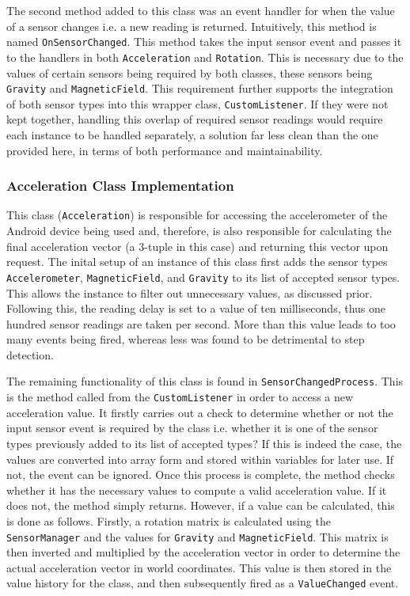 \documentclass[main.tex]{subfiles}
\begin{document}
            The second method added to this class was an event handler for when the value of a sensor changes i.e. a new reading is returned. Intuitively, this method
            is named \texttt{OnSensorChanged}. This method takes the input sensor event and passes it to the handlers in both \texttt{Acceleration} and \texttt{Rotation}.
            This is necessary due to the values of certain sensors being required by both classes, these sensors being \texttt{Gravity} and \texttt{MagneticField}. This requirement
            further supports the integration of both sensor types into this wrapper class, \texttt{CustomListener}. If they were not kept together, handling this overlap of 
            required sensor readings would require each instance to be handled separately, a solution far less clean than the one provided here, in terms of both performance and
            maintainability.
        \subsubsection{Acceleration Class Implementation}
            This class (\texttt{Acceleration}) is responsible for accessing the accelerometer of the Android device being used and, therefore, is also responsible for calculating
            the final acceleration vector (a 3-tuple in this case) and returning this vector upon request. The inital setup of an instance of this class first adds 
            the sensor types \texttt{Accelerometer}, \texttt{MagneticField}, and \texttt{Gravity} to its list of accepted sensor types. This allows the instance to filter out
            unnecessary values, as discussed prior. Following this, the reading delay is set to a value of ten milliseconds, thus one hundred sensor readings are taken per second.
            More than this value
            leads to too many events being fired, whereas less was found to be detrimental to step detection.
            
            The remaining functionality of this class is found in \texttt{SensorChangedProcess}. This is the method called from the \texttt{CustomListener} in order to access a new
            acceleration value. It firstly carries out a check to determine whether or not the input sensor event is required by the class i.e. whether it is one of the sensor types previously
            added to its list of accepted types? If this is indeed the case, the values are converted into array form and stored within variables for later use. If not, the event can
            be ignored. Once this process is complete, the method checks whether it has the necessary values to compute a valid acceleration value. If it does not, the method 
            simply returns. However, if a value can be calculated, this is done as follows. Firstly, a rotation matrix is calculated using the \texttt{SensorManager} and the
            values for \texttt{Gravity} and \texttt{MagneticField}. This matrix is then inverted and multiplied by the acceleration vector in order to determine the actual
            acceleration vector in world coordinates. This value is then stored in the value history for the class, and then subsequently fired as a \texttt{ValueChanged} event.
\end{document}
